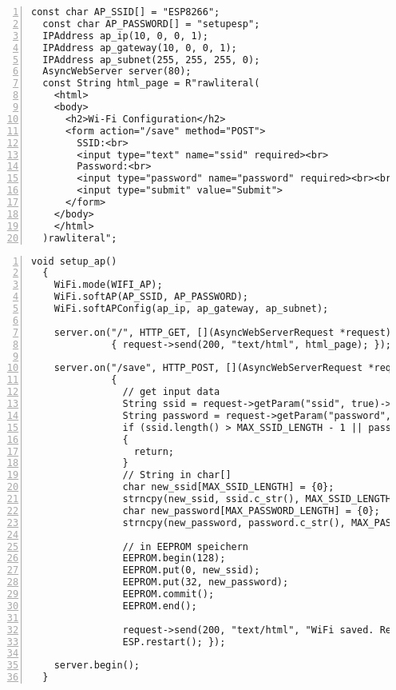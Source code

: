 \documentclass[12pt, letterpaper]{article}
\begin{document}
\begin{lstlisting}[frame=single, style=cpp, numbers=left, label={lst:esp8266defap}, caption={ESP8266: ap\_konfiguration}]
  const char AP_SSID[] = "ESP8266";
  const char AP_PASSWORD[] = "setupesp";
  IPAddress ap_ip(10, 0, 0, 1);
  IPAddress ap_gateway(10, 0, 0, 1);
  IPAddress ap_subnet(255, 255, 255, 0);
  AsyncWebServer server(80);
  const String html_page = R"rawliteral(
    <html>
    <body>
      <h2>Wi-Fi Configuration</h2>
      <form action="/save" method="POST">
        SSID:<br>
        <input type="text" name="ssid" required><br>
        Password:<br>
        <input type="password" name="password" required><br><br>
        <input type="submit" value="Submit">
      </form>
    </body>
    </html>
  )rawliteral";
\end{lstlisting}
\begin{lstlisting}[frame=single, style=cpp, numbers=left, label={lst:esp8266setupap}, caption={ESP: setup\_ap}]
  void setup_ap()
  {
    WiFi.mode(WIFI_AP);
    WiFi.softAP(AP_SSID, AP_PASSWORD);
    WiFi.softAPConfig(ap_ip, ap_gateway, ap_subnet);
  
    server.on("/", HTTP_GET, [](AsyncWebServerRequest *request)
              { request->send(200, "text/html", html_page); });
  
    server.on("/save", HTTP_POST, [](AsyncWebServerRequest *request)
              {
                // get input data
                String ssid = request->getParam("ssid", true)->value();
                String password = request->getParam("password", true)->value();
                if (ssid.length() > MAX_SSID_LENGTH - 1 || password.length() > MAX_PASSWORD_LENGTH - 1)
                {
                  return;
                }
                // String in char[]
                char new_ssid[MAX_SSID_LENGTH] = {0};
                strncpy(new_ssid, ssid.c_str(), MAX_SSID_LENGTH - 1);
                char new_password[MAX_PASSWORD_LENGTH] = {0};
                strncpy(new_password, password.c_str(), MAX_PASSWORD_LENGTH - 1);
  
                // in EEPROM speichern
                EEPROM.begin(128);
                EEPROM.put(0, new_ssid);
                EEPROM.put(32, new_password);
                EEPROM.commit();
                EEPROM.end();
  
                request->send(200, "text/html", "WiFi saved. Rebooting...");
                ESP.restart(); });
  
    server.begin();
  }
\end{lstlisting}
\end{document}
